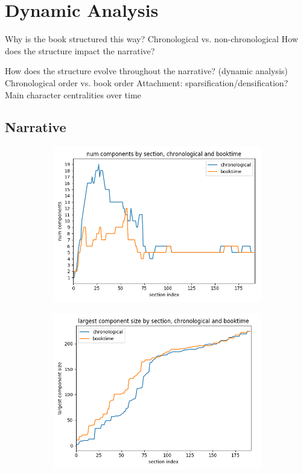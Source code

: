 \section{Dynamic Analysis}

Why is the book structured this way?
Chronological vs. non-chronological
How does the structure impact the narrative?

How does the structure evolve throughout the narrative? (dynamic analysis)
Chronological order vs. book order
Attachment: sparsification/densification?
Main character centralities over time

\subsection{Narrative}

\begin{figure}[ht]
    \centering
    \begin{subfigure}{0.4\textwidth}
        \includegraphics[width=1.\textwidth]{images/dynamics-num-components.png}
        \caption{}
    \end{subfigure}
    \begin{subfigure}{0.4\textwidth}
        \includegraphics[width=1.\textwidth]{images/dynamics-largest-components.png}
        \caption{}
    \end{subfigure}
    \caption{}
    \label{component-sizes}
\end{figure}

